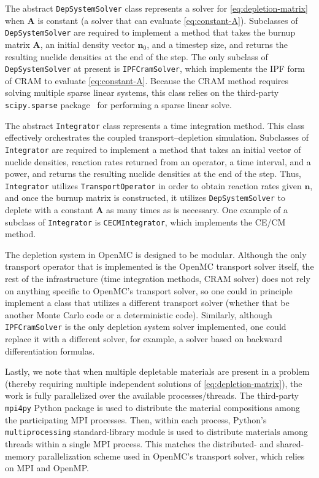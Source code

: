 \documentclass[3p,authoryear]{elsarticle}
\newcommand{\vect}[1]{\mathbf{#1}} %
\begin{document}
The abstract \texttt{DepSystemSolver} class represents a solver for
\cref{eq:depletion-matrix} when $\vect{A}$ is constant (a solver that can
evaluate \cref{eq:constant-A}). Subclasses of \texttt{DepSystemSolver} are
required to implement a method that takes the burnup matrix $\vect{A}$, an
initial density vector $\vect{n}_0$, and a timestep size, and returns the
resulting nuclide densities at the end of the step. The only subclass of
\texttt{DepSystemSolver} at present is \texttt{IPFCramSolver}, which implements
the IPF form of CRAM to evaluate \cref{eq:constant-A}. Because the CRAM method
requires solving multiple sparse linear systems, this class relies on the
third-party \texttt{scipy.sparse} package~\citep{virtanen2020nm} for performing
a sparse linear solve.

The abstract \texttt{Integrator} class represents a time integration method.
This class effectively orchestrates the coupled transport--depletion simulation.
Subclasses of \texttt{Integrator} are required to implement a method that takes
an initial vector of nuclide densities, reaction rates returned from an
operator, a time interval, and a power, and returns the resulting nuclide
densities at the end of the step. Thus, \texttt{Integrator} utilizes
\texttt{TransportOperator} in order to obtain reaction rates given $\vect{n}$,
and once the burnup matrix is constructed, it utilizes \texttt{DepSystemSolver}
to deplete with a constant $\vect{A}$ as many times as is necessary. One example
of a subclass of \texttt{Integrator} is \texttt{CECMIntegrator}, which
implements the CE/CM method.

The depletion system in OpenMC is designed to be modular. Although the only
transport operator that is implemented is the OpenMC transport solver itself,
the rest of the infrastructure (time integration methods, CRAM solver) does not
rely on anything specific to OpenMC's transport solver, so one could in
principle implement a class that utilizes a different transport solver (whether
that be another Monte Carlo code or a deterministic code). Similarly, although
\texttt{IPFCramSolver} is the only depletion system solver implemented, one
could replace it with a different solver, for example, a solver based on
backward differentiation formulas.

Lastly, we note that when multiple depletable materials are present in a problem
(thereby requiring multiple independent solutions of
\cref{eq:depletion-matrix}), the work is fully parallelized over the available
processes/threads. The third-party \texttt{mpi4py} Python package is used to
distribute the material compositions among the participating MPI processes.
Then, within each process, Python's \texttt{multiprocessing} standard-library
module is used to distribute materials among threads within a single MPI
process. This matches the distributed- and shared-memory parallelization scheme
used in OpenMC's transport solver, which relies on MPI and OpenMP.
\end{document}
